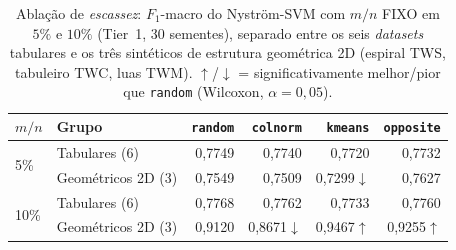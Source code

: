 \begin{table}[ht]
  \centering
  \caption{Ablação de \emph{escassez}: $F_1$-macro do Nyström-SVM com $m/n$ FIXO em $5\%$ e $10\%$ (Tier~1, 30 sementes), separado entre os seis \emph{datasets} tabulares e os três sintéticos de estrutura geométrica 2D (espiral TWS, tabuleiro TWC, luas TWM). $\uparrow$/$\downarrow$ = significativamente melhor/pior que \texttt{random} (Wilcoxon, $\alpha=0{,}05$).}
  \label{tab:app_selection_scarcity}
  \begin{tabular}{llrrrr}
    \toprule
    $m/n$ & Grupo & \texttt{random} & \texttt{colnorm} & \texttt{kmeans} & \texttt{opposite} \\
    \midrule
    \multirow{2}{*}{5\%} & Tabulares (6) & 0,7749 & 0,7740 & 0,7720 & 0,7732 \\
     & Geométricos 2D (3) & 0,7549 & 0,7509 & 0,7299$\downarrow$ & 0,7627 \\
    \midrule
    \multirow{2}{*}{10\%} & Tabulares (6) & 0,7768 & 0,7762 & 0,7733 & 0,7760 \\
     & Geométricos 2D (3) & 0,9120 & 0,8671$\downarrow$ & 0,9467$\uparrow$ & 0,9255$\uparrow$ \\
    \bottomrule
  \end{tabular}
\end{table}

